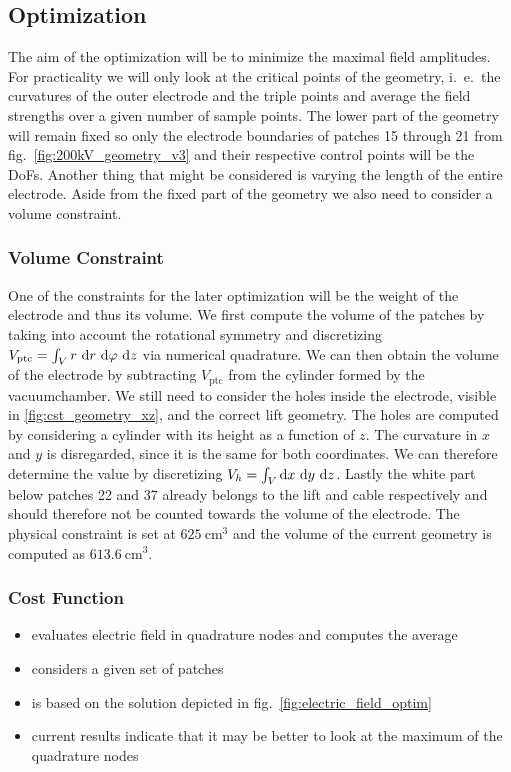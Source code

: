 \subsection{Optimization}
The aim of the optimization will be to minimize the maximal field amplitudes. For practicality we will only look at the critical points of the geometry, i.~e.~the curvatures of the outer electrode and the triple points and average the field strengths over a given number of sample points. The lower part of the geometry will remain fixed so only the electrode boundaries of patches 15 through 21 from fig.~\ref{fig:200kV_geometry_v3} and their respective control points will be the DoFs. Another thing that might be considered is varying the length of the entire electrode. Aside from the fixed part of the geometry we also need to consider a volume constraint.

\subsubsection{Volume Constraint}
One of the constraints for the later optimization will be the weight of the electrode and thus its volume.
We first compute the volume of the patches by taking into account the rotational symmetry and discretizing $V_{\mathrm{ptc}} = \int_V r\ \mathrm{d} r\ \mathrm{d} \varphi\ \mathrm{d} z$ via numerical quadrature. We can then obtain the volume of the electrode by subtracting $V_{\mathrm{ptc}}$ from the cylinder formed by the vacuumchamber.
We still need to consider the holes inside the electrode, visible in \ref{fig:cst_geometry_xz}, and the correct lift geometry. The holes are computed by considering a cylinder with its height as a function of $z$. The curvature in $x$ and $y$ is disregarded, since it is the same for both coordinates. We can therefore determine the value by discretizing $V_{h} = \int_V \mathrm{d} x\ \mathrm{d} y\ \mathrm{d} z$.
Lastly the white part below patches 22 and 37 already belongs to the lift and cable respectively and should therefore not be counted towards the volume of the electrode.
The physical constraint is set at $625\ \mathrm{cm}^3$ and the volume of the current geometry is computed as $613.6\ \mathrm{cm}^3$.

\subsubsection{Cost Function}
\begin{itemize}
   \item evaluates electric field in quadrature nodes and computes the average
   \item considers a given set of patches
   \item is based on the solution depicted in fig.~\ref{fig:electric_field_optim}
   \item current results indicate that it may be better to look at the maximum of the quadrature nodes
\end{itemize}

